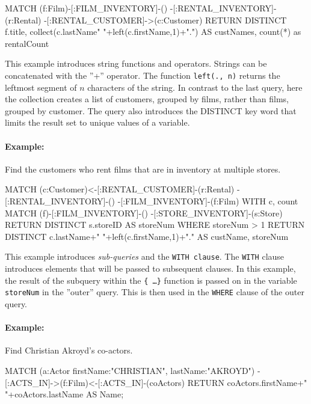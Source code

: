 \begin{cyphercode}
MATCH (f:Film)-[:FILM_INVENTORY]-()
      -[:RENTAL_INVENTORY]-(r:Rental)
      -[:RENTAL_CUSTOMER]->(c:Customer)
RETURN DISTINCT f.title, 
      collect(c.lastName" "+left(c.firstName,1)+".") AS custNames, 
      count(*) as rentalCount
\end{cyphercode}

This example introduces string functions and operators. Strings can be concatenated with the ''+'' operator. The function \texttt{left(., n)} returns the leftmost segment of $n$ characters of the string. In contrast to the last query, here the collection creates a list of customers, grouped by films, rather than films, grouped by customer. The query also introduces the DISTINCT key word that limits the result set to unique values of a variable.

\paragraph*{Example:} Find the customers who rent films that are in inventory at multiple stores.

\begin{cyphercode}
MATCH (c:Customer)<-[:RENTAL_CUSTOMER]-(r:Rental)
       -[:RENTAL_INVENTORY]-()
       -[:FILM_INVENTORY]-(f:Film) 
WITH c, count{ 
  MATCH (f)-[:FILM_INVENTORY]-()
        -[:STORE_INVENTORY]-(s:Store) 
  RETURN DISTINCT s.storeID } AS storeNum
WHERE storeNum > 1
RETURN DISTINCT 
  c.lastName+" "+left(c.firstName,1)+"." AS custName, 
  storeNum
\end{cyphercode}

This example introduces \emph{sub-queries} and the \texttt{WITH clause}. The \texttt{WITH} clause introduces elements that will be passed to subsequent clauses. In this example, the result of the subquery within the \texttt{\{ \ldots \}} function is passed on in the variable \texttt{storeNum} in the ''outer'' query. This is then used in the \texttt{WHERE} clause of the outer query.

\paragraph*{Example:} Find Christian Akroyd's co-actors.

\begin{cyphercode}
MATCH (a:Actor {firstName:"CHRISTIAN", lastName:"AKROYD"}) 
      -[:ACTS_IN]->(f:Film)<-[:ACTS_IN]-(coActors) 
RETURN coActors.firstName+" "+coActors.lastName AS Name;
\end{cyphercode}

